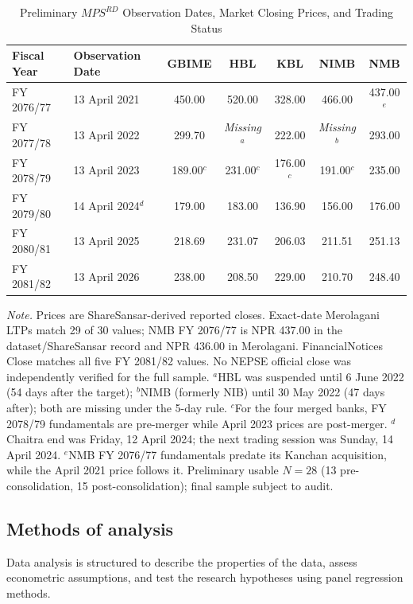 \begin{table}[!ht]
\centering
\small
\captionsetup{font=normalsize,labelsep=newline,textfont=it,justification=justified,singlelinecheck=false}
\caption{Preliminary $MPS^{RD}$ Observation Dates, Market Closing Prices, and Trading Status}
\label{tab:mps_rd}
\begin{tabular}{llccccc}
\toprule
Fiscal Year & Observation Date & GBIME & HBL & KBL & NIMB & NMB \\
\midrule
FY 2076/77 & 13 April 2021 & 450.00 & 520.00 & 328.00 & 466.00 & 437.00$^e$ \\
FY 2077/78 & 13 April 2022 & 299.70 & \textit{Missing}$^a$ & 222.00 & \textit{Missing}$^b$ & 293.00 \\
FY 2078/79 & 13 April 2023 & 189.00$^c$ & 231.00$^c$ & 176.00$^c$ & 191.00$^c$ & 235.00 \\
FY 2079/80 & 14 April 2024$^d$ & 179.00 & 183.00 & 136.90 & 156.00 & 176.00 \\
FY 2080/81 & 13 April 2025 & 218.69 & 231.07 & 206.03 & 211.51 & 251.13 \\
FY 2081/82 & 13 April 2026 & 238.00 & 208.50 & 229.00 & 210.70 & 248.40 \\
\bottomrule
\end{tabular}

\vspace{4pt}
\begin{minipage}{\linewidth}
\footnotesize
\textit{Note.} Prices are ShareSansar-derived reported closes. Exact-date Merolagani LTPs match 29 of 30 values; NMB FY 2076/77 is NPR 437.00 in the dataset/ShareSansar record and NPR 436.00 in Merolagani. FinancialNotices Close matches all five FY 2081/82 values. No NEPSE official close was independently verified for the full sample. $^a$HBL was suspended until 6 June 2022 (54 days after the target); $^b$NIMB (formerly NIB) until 30 May 2022 (47 days after); both are missing under the 5-day rule. $^c$For the four merged banks, FY 2078/79 fundamentals are pre-merger while April 2023 prices are post-merger. $^d$Chaitra end was Friday, 12 April 2024; the next trading session was Sunday, 14 April 2024. $^e$NMB FY 2076/77 fundamentals predate its Kanchan acquisition, while the April 2021 price follows it. Preliminary usable $N = 28$ (13 pre-consolidation, 15 post-consolidation); final sample subject to audit.
\end{minipage}
\end{table}

\subsection{Methods of analysis}
Data analysis is structured to describe the properties of the data, assess econometric assumptions, and test the research hypotheses using panel regression methods.

